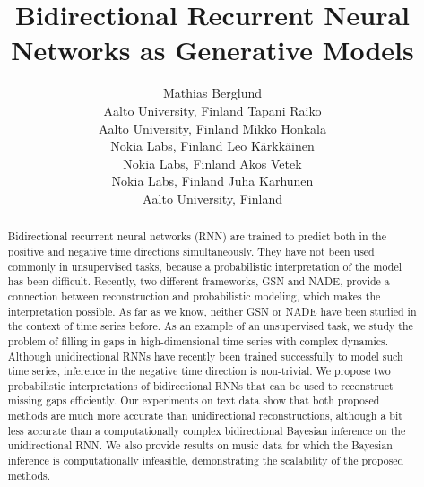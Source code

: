 \documentclass{article}
\newcommand{\keywords}[1]{\par\addvspace\baselineskip
\noindent\keywordname\enspace\ignorespaces#1}
\begin{document}
\title{Bidirectional Recurrent Neural Networks as Generative Models}

\author{Mathias Berglund \\ Aalto University, Finland \And Tapani Raiko \\ Aalto University, Finland \And Mikko 
Honkala  \\ Nokia Labs, Finland  \And Leo K\"{a}rkk\"{a}inen \\ Nokia Labs, Finland  \And Akos Vetek \\ Nokia Labs, Finland 
\And 
Juha Karhunen \\ Aalto University, Finland }


\maketitle

\begin{abstract}

Bidirectional recurrent neural networks (RNN) are trained to predict both in the 
positive and negative time directions simultaneously. They have not been 
used commonly in unsupervised tasks, because a probabilistic interpretation 
of the model has been difficult. 
Recently, two different frameworks, GSN and NADE, provide a connection between reconstruction and probabilistic modeling, which makes the interpretation possible. 
As far as we know, neither GSN or NADE have been studied in the context of time series before.
As an example of an unsupervised task, we study 
the problem of filling in gaps in high-dimensional time series with complex dynamics. 
Although unidirectional RNNs have recently been trained 
successfully to model such time series, inference in the negative time 
direction is non-trivial. 
We propose two probabilistic interpretations of bidirectional RNNs that can be 
used to reconstruct missing gaps efficiently. Our experiments on text data show 
that both proposed methods are much more accurate than unidirectional 
reconstructions, although a bit less accurate than a computationally complex 
bidirectional Bayesian inference on the unidirectional RNN. We also provide 
results on music data for which the Bayesian inference is computationally infeasible, demonstrating the scalability of the proposed methods.


\end{abstract}
\end{document}
